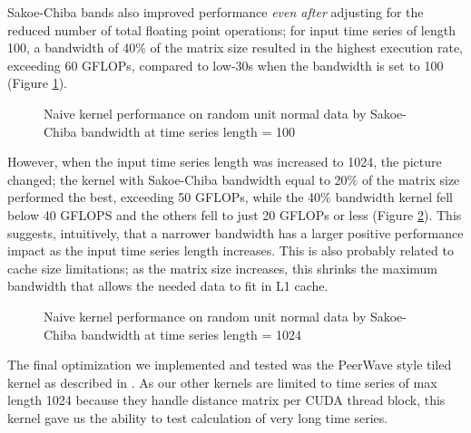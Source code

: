 \documentclass[12pt, letterpaper]{article}
\begin{document}
Sakoe-Chiba bands also improved performance \emph{even after} adjusting for the
reduced number of total floating point operations; for input time series of
length 100, a bandwidth of 40\% of the matrix size resulted in the highest
execution rate, exceeding 60 GFLOPs, compared to low-30s when the bandwidth is
set to 100 (Figure \ref{plot_bw}).

\begin{figure}[htbp]
    \begin{center}
        \scalebox{0.85}{}
    \end{center}
    \caption{Naive kernel performance on random unit normal data by
      Sakoe-Chiba bandwidth at time series length = 100}
    \label{plot_bw}
\end{figure}

However, when the input time series length was increased to 1024, the picture
changed; the kernel with Sakoe-Chiba bandwidth equal to 20\% of the matrix size
performed the best, exceeding 50 GFLOPs, while the 40\% bandwidth kernel fell
below 40 GFLOPS and the others fell to just 20 GFLOPs or less (Figure
\ref{plot_bw_1024}). This suggests, intuitively, that a narrower bandwidth has a
larger positive performance impact as the input time series length increases.
This is also probably related to cache size limitations; as the matrix size
increases, this shrinks the maximum bandwidth that allows the needed data to fit
in L1 cache.

\begin{figure}[htbp]
    \begin{center}
        \scalebox{0.85}{}
    \end{center}
    \caption{Naive kernel performance on random unit normal data by
      Sakoe-Chiba bandwidth at time series length = 1024}
    \label{plot_bw_1024}
\end{figure}

The final optimization we implemented and tested was the PeerWave style tiled
kernel as described in \cite{belviranli_peerwave_2015}. As our other kernels are
limited to time series of max length 1024 because they handle distance matrix
per CUDA thread block, this kernel gave us the ability to test calculation of
very long time series.
\end{document}
